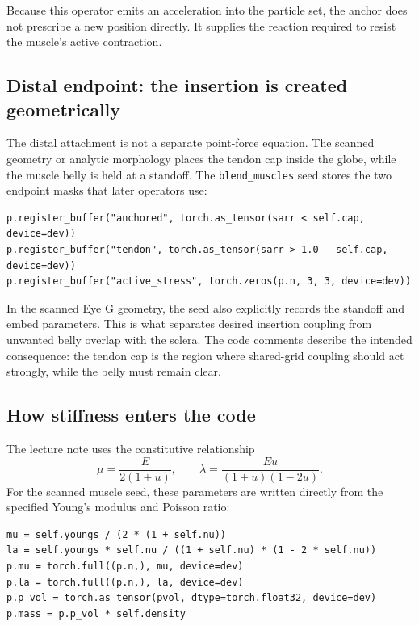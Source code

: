 \documentclass[11pt]{article}
\begin{document}
Because this operator emits an acceleration into the particle set, the anchor does not prescribe a new position directly. It supplies the reaction required to resist the muscle's active contraction.

\subsection{Distal endpoint: the insertion is created geometrically}

The distal attachment is not a separate point-force equation. The scanned geometry or analytic morphology places the tendon cap inside the globe, while the muscle belly is held at a standoff. The \texttt{blend\_muscles} seed stores the two endpoint masks that later operators use:

\begin{lstlisting}[caption={\texttt{prototype/eye/blend\_mpm\_ops.py}: tendon and proximal-cap labels established during seeding.},label={lst:tendon-cap-code}]
p.register_buffer("anchored", torch.as_tensor(sarr < self.cap, device=dev))
p.register_buffer("tendon", torch.as_tensor(sarr > 1.0 - self.cap, device=dev))
p.register_buffer("active_stress", torch.zeros(p.n, 3, 3, device=dev))
\end{lstlisting}

In the scanned Eye G geometry, the seed also explicitly records the standoff and embed parameters. This is what separates desired insertion coupling from unwanted belly overlap with the sclera. The code comments describe the intended consequence: the tendon cap is the region where shared-grid coupling should act strongly, while the belly must remain clear.

\subsection{How stiffness enters the code}

The lecture note uses the constitutive relationship
\begin{equation}
\mu=\frac{E}{2(1+
u)},
\qquad
\lambda=\frac{E
u}{(1+
u)(1-2
u)}.
\label{eq:auto36}
\end{equation}
For the scanned muscle seed, these parameters are written directly from the specified Young's modulus and Poisson ratio:

\begin{lstlisting}[caption={\texttt{prototype/eye/blend\_mpm\_ops.py}: Young's modulus to Lamé parameters; particle volume and mass.},label={lst:lame-code}]
mu = self.youngs / (2 * (1 + self.nu))
la = self.youngs * self.nu / ((1 + self.nu) * (1 - 2 * self.nu))
p.mu = torch.full((p.n,), mu, device=dev)
p.la = torch.full((p.n,), la, device=dev)
p.p_vol = torch.as_tensor(pvol, dtype=torch.float32, device=dev)
p.mass = p.p_vol * self.density
\end{lstlisting}
\end{document}
